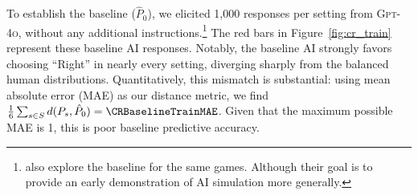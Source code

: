 To establish the baseline ($\hat P_0$), we elicited 1,000 responses per setting from \textsc{Gpt-4o}, without any additional instructions.\footnote{\cite{horton2023large} also explore the baseline for the same games. Although their goal is to provide an early demonstration of AI simulation more generally.}
The red bars in Figure~\ref{fig:cr_train} represent these baseline AI responses. Notably, the baseline AI strongly favors choosing ``Right'' in nearly every setting, diverging sharply from the balanced human distributions. 
Quantitatively, this mismatch is substantial: using mean absolute error (MAE) as our distance metric, we find $\frac{1}{6}\sum_{s \in S} d(P_s,\hat P_0)=\CRBaselineTrainMAE$. 
Given that the maximum possible MAE is 1, this is poor baseline predictive accuracy.

